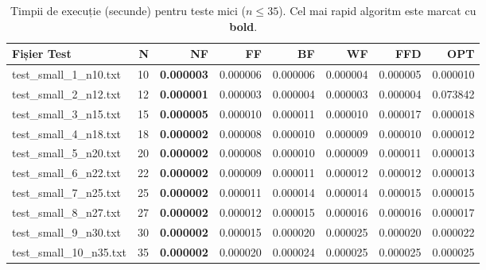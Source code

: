 \documentclass[runningheads]{llncs}
\begin{document}
\begin{table}[H]
\centering
\caption{Timpii de execuție (secunde) pentru teste mici ($n \leq 35$). Cel mai rapid algoritm este marcat cu \textbf{bold}.}
\label{tab:times_small}
\scriptsize
\begin{tabular}{|l|r|r|r|r|r|r|r|}
\hline
\textbf{Fișier Test} & \textbf{N} & \textbf{NF} & \textbf{FF} & \textbf{BF} & \textbf{WF} & \textbf{FFD} & \textbf{OPT} \\
\hline
test\_small\_1\_n10.txt & 10 & \textbf{0.000003} & 0.000006 & 0.000006 & 0.000004 & 0.000005 & 0.000010 \\
test\_small\_2\_n12.txt & 12 & \textbf{0.000001} & 0.000003 & 0.000004 & 0.000003 & 0.000004 & 0.073842 \\
test\_small\_3\_n15.txt & 15 & \textbf{0.000005} & 0.000010 & 0.000011 & 0.000010 & 0.000017 & 0.000018 \\
test\_small\_4\_n18.txt & 18 & \textbf{0.000002} & 0.000008 & 0.000010 & 0.000009 & 0.000010 & 0.000012 \\
test\_small\_5\_n20.txt & 20 & \textbf{0.000002} & 0.000008 & 0.000010 & 0.000009 & 0.000011 & 0.000013 \\
test\_small\_6\_n22.txt & 22 & \textbf{0.000002} & 0.000009 & 0.000011 & 0.000012 & 0.000012 & 0.000013 \\
test\_small\_7\_n25.txt & 25 & \textbf{0.000002} & 0.000011 & 0.000014 & 0.000014 & 0.000015 & 0.000015 \\
test\_small\_8\_n27.txt & 27 & \textbf{0.000002} & 0.000012 & 0.000015 & 0.000016 & 0.000016 & 0.000017 \\
test\_small\_9\_n30.txt & 30 & \textbf{0.000002} & 0.000015 & 0.000020 & 0.000025 & 0.000020 & 0.000022 \\
test\_small\_10\_n35.txt & 35 & \textbf{0.000002} & 0.000020 & 0.000024 & 0.000025 & 0.000025 & 0.000025 \\
\hline
\end{tabular}
\end{table}
\end{document}
